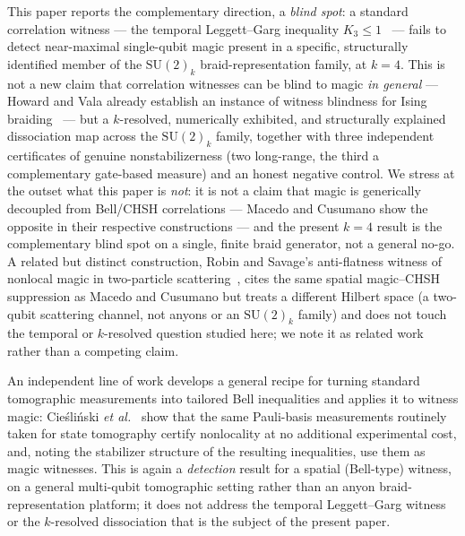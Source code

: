 \documentclass[aps,pra,twocolumn,superscriptaddress,longbibliography,floatfix,nofootinbib]{revtex4-2}
\begin{document}
This paper reports the complementary direction, a \emph{blind spot}:
a standard correlation witness --- the temporal Leggett--Garg
inequality $K_3\le1$~\cite{LeggettGarg1985,Budroni2014} --- fails to
detect near-maximal single-qubit magic present in a specific,
structurally identified member of the $\mathrm{SU}(2)_k$
braid-representation family, at $k=4$. This is not a new claim that
correlation witnesses can be blind to magic \emph{in general} ---
Howard and Vala already establish an instance of witness blindness for
Ising braiding~\cite{HowardVala2012} --- but a $k$-resolved,
numerically exhibited, and structurally explained dissociation map
across the $\mathrm{SU}(2)_k$ family, together with three independent
certificates of genuine nonstabilizerness (two long-range, the third
a complementary gate-based measure) and an honest negative
control. We stress at the outset what this paper is \emph{not}: it is
not a claim that magic is generically decoupled from Bell/CHSH
correlations --- Macedo and Cusumano show the opposite in their
respective constructions --- and the present $k=4$ result is the
complementary blind spot on a single, finite braid generator, not a
general no-go. A related but distinct construction, Robin and
Savage's anti-flatness witness of nonlocal magic in two-particle
scattering~\cite{RobinSavage2025}, cites the same spatial
magic--CHSH suppression as Macedo and Cusumano but treats a
different Hilbert space (a two-qubit scattering channel, not anyons
or an $\mathrm{SU}(2)_k$ family) and does not touch the temporal or
$k$-resolved question studied here; we note it as related work
rather than a competing claim.

An independent line of work develops a general recipe for turning
standard tomographic measurements into tailored Bell inequalities and
applies it to witness magic: Cie\'sli\'nski \emph{et
al.}~\cite{Cieslinski2026} show that the same Pauli-basis measurements
routinely taken for state tomography certify nonlocality at no
additional experimental cost, and, noting the stabilizer structure of
the resulting inequalities, use them as magic witnesses. This is again a
\emph{detection} result for a spatial (Bell-type) witness, on a
general multi-qubit tomographic setting rather than an anyon
braid-representation platform; it does not address the temporal
Leggett--Garg witness or the $k$-resolved dissociation that is the
subject of the present paper.
\end{document}
